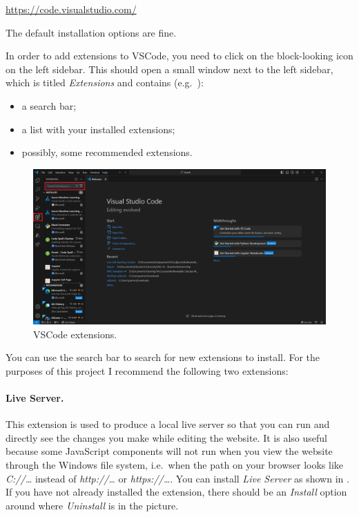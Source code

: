\documentclass[a4paper,10pt]{article}
\begin{document}
\url{https://code.visualstudio.com/}

The default installation options are fine.

In order to add extensions to VSCode, you need to click on the block-looking icon on the left sidebar. This should open a small window next to the left sidebar, which is titled \emph{Extensions} and contains (e.g.\ ):
\begin{itemize}
    \item a search bar;
    \item a list with your installed extensions;
    \item possibly, some recommended extensions.
\end{itemize}

\begin{figure}[htbp]
    \centering
    \includegraphics[width=\textwidth]{extensions.png}
    \caption{VSCode extensions.}
    \label{fig:extensions}   
\end{figure}

You can use the search bar to search for new extensions to install. For the purposes of this project I recommend the following two extensions:

\paragraph{Live Server.} This extension is used to produce a local live server so that you can run and directly see the changes you make while editing the website. It is also useful because some JavaScript components will not run when you view the website through the Windows file system, i.e.\ when the path on your browser looks like \emph{C://\dots} instead of \emph{http://\dots} or \emph{https://\dots}. You can install \emph{Live Server} as shown in . If you have not already installed the extension, there should be an \emph{Install} option around where \emph{Uninstall} is in the picture.
\end{document}
